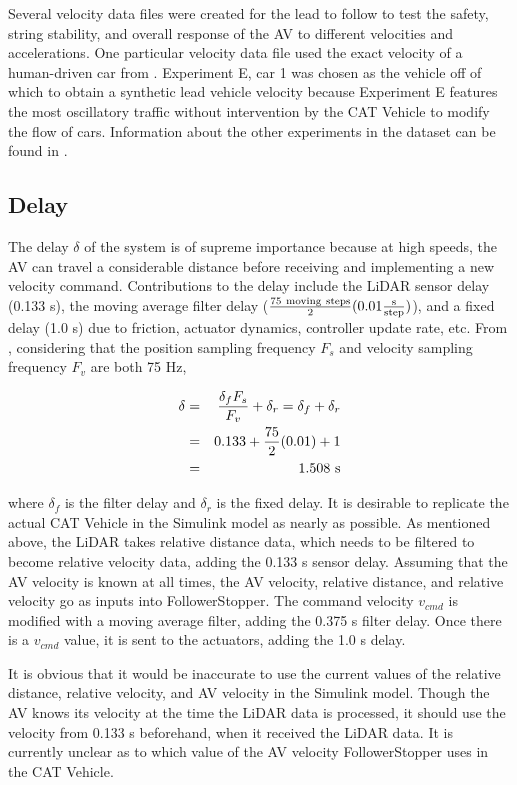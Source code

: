 \documentclass[conference]{IEEEtran}
\begin{document}
Several velocity data files were created for the lead to follow to test the safety, string stability, and overall response of the AV to different velocities and accelerations. One particular velocity data file used the exact velocity of a human-driven car from \cite{wu2018arizona}. Experiment E, car 1 was chosen as the vehicle off of which to obtain a synthetic lead vehicle velocity because Experiment E features the most oscillatory traffic without intervention by the CAT Vehicle to modify the flow of cars. Information about the other experiments in the dataset can be found in \cite{wu2019tracking}.


\subsection{Delay}
The delay $\delta$ of the system is of supreme importance because at high speeds, the AV can travel a considerable distance before receiving and implementing a new velocity command. Contributions to the delay include the LiDAR sensor delay (0.133 s), the moving average filter delay ($\rm {75\ moving\ steps\over 2}(0.01{s\over step})$), and a fixed delay (1.0 s) due to friction, actuator dynamics, controller update rate, etc. From \cite{bhadani2019real}, considering that the position sampling frequency $F_s$ and velocity sampling frequency $F_v$ are both 75 Hz,

\begin{eqnarray*}
\delta &=& {\delta_f F_s \over F_v}+\delta_r = \delta_f +\delta_r \\
&=& 0.133+{75\over 2}(0.01)+1\\
&=& 1.508 \rm\ s
\end{eqnarray*}

where $\delta_f$ is the filter delay and $\delta_r$ is the fixed delay. It is desirable to replicate the actual CAT Vehicle in the Simulink model as nearly as possible. As mentioned above, the LiDAR takes relative distance data, which needs to be filtered to become relative velocity data, adding the 0.133 s sensor delay. Assuming that the AV velocity is known at all times, the AV velocity, relative distance, and relative velocity go as inputs into FollowerStopper. The command velocity $v_{cmd}$ is modified with a moving average filter, adding the 0.375 s filter delay. Once there is a $v_{cmd}$ value, it is sent to the actuators, adding the 1.0 s delay. 

It is obvious that it would be inaccurate to use the current values of the relative distance, relative velocity, and AV velocity in the Simulink model. Though the AV knows its velocity at the time the LiDAR data is processed, it should use the velocity from 0.133 s beforehand, when it received the LiDAR data. It is currently unclear as to which value of the AV velocity FollowerStopper uses in the CAT Vehicle. 
\end{document}
